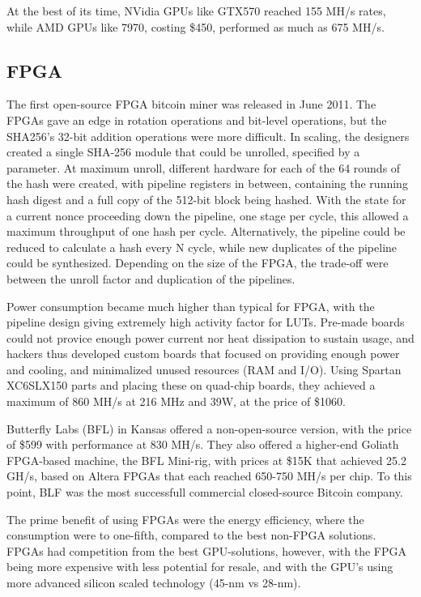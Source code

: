 At the best of its time, NVidia GPUs like GTX570 reached 155 MH/s rates, while AMD GPUs like 7970, costing \$450, performed as much as 675 MH/s.\cite{bespoke-silicon}

\subsection{FPGA}
The first open-source FPGA bitcoin miner was released in June 2011.
The FPGAs gave an edge in rotation operations and bit-level operations, but the SHA256's 32-bit addition operations were more difficult.
In scaling, the designers created a single SHA-256 module that could be unrolled, specified by a parameter.
At maximum unroll, different hardware for each of the 64 rounds of the hash were created, with pipeline registers in between, containing the running hash digest and a full copy of the 512-bit block being hashed.
With the state for a current nonce proceeding down the pipeline, one stage per cycle, this allowed a maximum throughput of one hash per cycle.
Alternatively, the pipeline could be reduced to calculate a hash every N cycle, while new duplicates of the pipeline could be synthesized.
Depending on the size of the FPGA, the trade-off were between the unroll factor and duplication of the pipelines.

Power consumption became much higher than typical for FPGA, with the pipeline design giving extremely high activity factor for LUTs.
Pre-made boards could not provice enough power current nor heat dissipation to sustain usage, and hackers thus developed custom boards that focused on providing enough power and cooling, and minimalized unused resources (RAM and I/O).
Using Spartan XC6SLX150 parts and placing these on quad-chip boards, they achieved a maximum of 860 MH/s at 216 MHz and 39W, at the price of \$1060.

Butterfly Labs (BFL) in Kansas offered a non-open-source version, with the price of \$599 with performance at 830 MH/s.
They also offered a higher-end Goliath FPGA-based machine, the BFL Mini-rig, with prices at \$15K that achieved 25.2 GH/s, based on Altera FPGAs that each reached 650-750 MH/s per chip.
To this point, BLF was the most successfull commercial closed-source Bitcoin company.

The prime benefit of using FPGAs were the energy efficiency, where the consumption were to one-fifth, compared to the best non-FPGA solutions.
FPGAs had competition from the best GPU-solutions, however, with the FPGA being more expensive with less potential for resale, and with the GPU's using more advanced silicon scaled technology (45-nm vs 28-nm).

